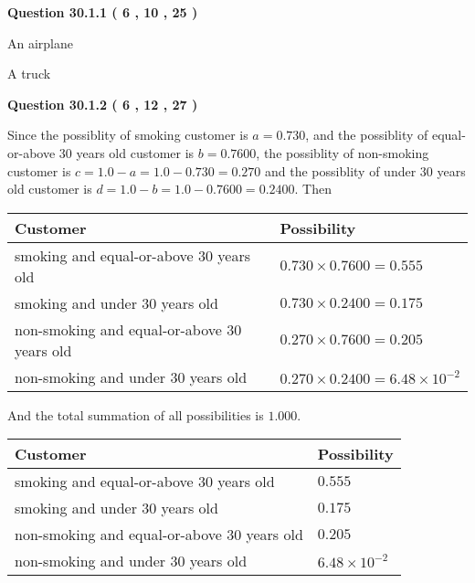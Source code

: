 \documentclass[12pt]{article}
\begin{document}
{\textbf{\Large{Question
30.1.1 
 (           6 ,          10 ,          25 )
}}}
  
  
 
 
\noindent{}
 
 
An airplane
 
 
A truck
 
 
 
 
  
\vspace{0.2in}
  
{\textbf{\Large{Question
30.1.2 
 (           6 ,          12 ,          27 )
}}}
  
  
 
 
\noindent{}

Since the possiblity of  %
smoking customer is $ a =  %
0.730 $,
and the possiblity of  %
equal-or-above 30 years old customer is $ b =  %
0.7600 $,
the possiblity of  %
non-smoking customer is $ c = 1.0 - a = 1.0 -
0.730
=  %
0.270 $ and the possiblity of  %
under 30 years old
customer is $ d = 1.0 - b = 1.0 -  %
0.7600 =  %
0.2400  $.
Then
 
\noindent
\begin{tabular}{|l|l|}
\hline
Customer & Possibility \\
\hline
smoking  and  %
equal-or-above 30 years old  &
  $ %
0.730 \times  %
0.7600 =  %
0.555$ \\
\hline
smoking  and  %
under 30 years old &
  $ %
0.730 \times  %
0.2400 =  %
0.175$ \\
\hline
 non-smoking and  %
equal-or-above 30 years old  &
  $ %
0.270 \times  %
0.7600 =  %
0.205$ \\
\hline
 non-smoking and  %
under 30 years old &
  $ %
0.270 \times  %
0.2400 =  %
6.48 \times 10^{-2}$ \\
\hline
\end{tabular}
 
\noindent
And the total summation of all possibilities is $  %
1.000 $.
 
 
 
 
 
 
\noindent{}

 
\noindent
\begin{tabular}{|l|l|}
\hline
Customer & Possibility \\
\hline
smoking  and  %
equal-or-above 30 years old &
  $ %
0.555$ \\
\hline
smoking  and  %
under 30 years old &
  $ %
0.175$ \\
\hline
 non-smoking and  %
equal-or-above 30 years old &
  $ %
0.205$ \\
\hline
 non-smoking and  %
under 30 years old &
  $ %
6.48 \times 10^{-2}$ \\
\hline
\end{tabular}
 
\end{document}

